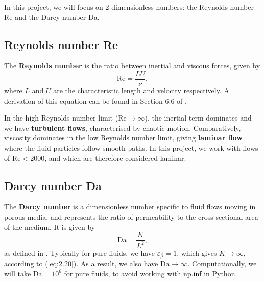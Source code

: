 \documentclass[a4paper, 11pt]{report}
\begin{document}
In this project, we will focus on 2 dimensionless numbers: the Reynolds number Re and the Darcy number Da.

\subsection{Reynolds number Re}
The \textbf{Reynolds number} is the ratio between inertial and viscous forces, given by
\begin{equation}
    \mathrm{Re} = \frac{LU}{\nu}, \label{eq:4.1}
\end{equation}
where $L$ and $U$ are the characteristic length and velocity respectively. A derivation of this equation can be found in Section 6.6 of \cite{fmnotes}. 

In the high Reynolds number limit ($\mathrm{Re} \rightarrow \infty$), the inertial term dominates and we have \textbf{turbulent flows}, characterised by chaotic motion. Comparatively, viscosity dominates in the low Reynolds number limit, giving \textbf{laminar flow} where the fluid particles follow smooth paths. In this project, we work with flows of $\mathrm{Re}<2000$, and which are therefore considered laminar.
\newpage
\subsection{Darcy number Da} \label{sec:4.1.2}
The \textbf{Darcy number} is a dimensionless number specific to fluid flows moving in porous media, and represents the ratio of permeability to the cross-sectional area of the medium. It is given by
\begin{equation}
    \mathrm{Da} = \frac{K}{L^2}, \label{eq:4.2}
\end{equation}
as defined in \cite{guo+zhao}. Typically for pure fluids, we have $\varepsilon_\beta = 1$, which gives $K\rightarrow\infty$, according to (\ref{eq:2.20}). As a result, we also have $\mathrm{Da}\rightarrow\infty$. Computationally, we will take $\mathrm{Da}=10^6$ for pure fluids, to avoid working with {\selectfont\textcolor{black}{np.inf}} in Python.

\end{document}
